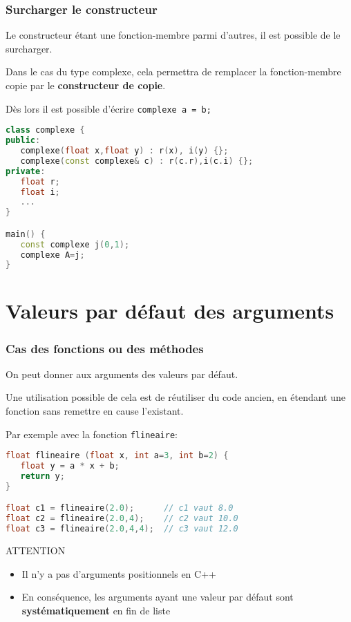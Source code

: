 \documentclass{beamer}
\begin{document}
\begin{frame}[fragile=singleslide,shrink=20]
\frametitle {Surcharger le constructeur}

Le constructeur étant une fonction-membre parmi d'autres, il est possible de le surcharger. 

Dans le cas du type complexe, cela permettra
de remplacer la fonction-membre copie par le \textbf{constructeur de copie}.

Dès lors il est possible d'écrire \texttt{complexe a = b;}

\begin{lstlisting}[language=c++]
class complexe {
public:
   complexe(float x,float y) : r(x), i(y) {};
   complexe(const complexe& c) : r(c.r),i(c.i) {};
private:
   float r;
   float i;
   ...
}

main() {
   const complexe j(0,1);
   complexe A=j;
}
\end{lstlisting}
\end{frame}

\section{Valeurs par défaut des arguments}

\begin{frame}[fragile=singleslide,shrink=20]
\frametitle {Cas des fonctions ou des méthodes}
On peut donner aux arguments des valeurs par défaut.

Une utilisation possible de cela est de réutiliser du code ancien, en étendant une fonction sans remettre en cause l'existant.

Par exemple avec la fonction \texttt{flineaire}:

\begin{lstlisting}[language=c++]
float flineaire (float x, int a=3, int b=2) {                   
   float y = a * x + b;
   return y;
}

float c1 = flineaire(2.0);      // c1 vaut 8.0
float c2 = flineaire(2.0,4);    // c2 vaut 10.0
float c3 = flineaire(2.0,4,4);  // c3 vaut 12.0
\end{lstlisting}

\begin{block}{ATTENTION}
\begin{itemize}
\item{Il n'y a pas d'arguments positionnels en C++}
\item{En conséquence, les arguments ayant une valeur par défaut sont \textbf{systématiquement} en fin de liste}
\end{itemize}
\end{block}
\end{frame}
\end{document}
